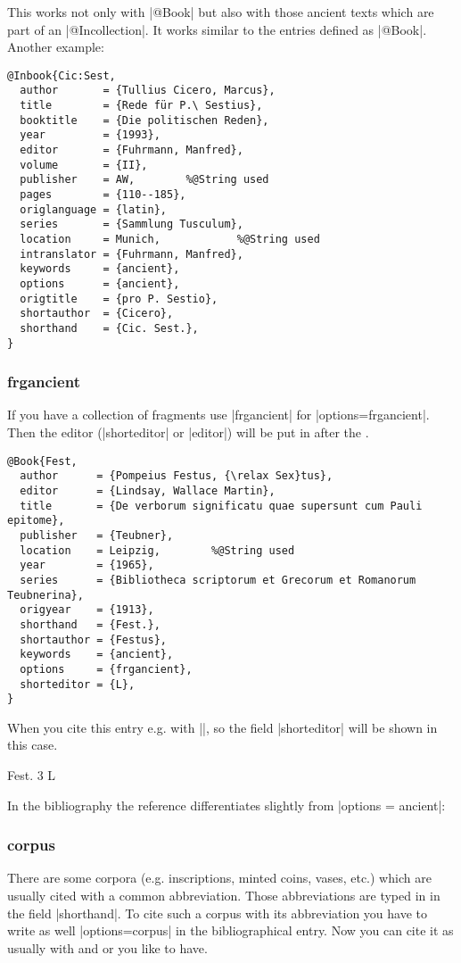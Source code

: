 \documentclass[a4paper,
10pt,
greek,
french,
spanish,
italian,
ngerman,
english
]{ltxdoc}
\begin{document}
This works not only with |@Book| but also with those ancient texts which are part of an |@Incollection|.
It works similar to the entries defined as |@Book|.
Another example:
\begin{lstlisting}[style=bibentry,label=Cic:Sest,caption={{@}Inbook\{Cic:Sest,…\} }]
@Inbook{Cic:Sest,
  author       = {Tullius Cicero, Marcus},
  title        = {Rede für P.\ Sestius},
  booktitle    = {Die politischen Reden},
  year         = {1993},
  editor       = {Fuhrmann, Manfred},
  volume       = {II},
  publisher    = AW,		%@String used
  pages        = {110--185},
  origlanguage = {latin},
  series       = {Sammlung Tusculum},
  location     = Munich,			%@String used
  intranslator = {Fuhrmann, Manfred},
  keywords     = {ancient},
  options      = {ancient},
  origtitle    = {pro P. Sestio},
  shortauthor  = {Cicero},
  shorthand    = {Cic. Sest.},
}
\end{lstlisting}




\subsubsection{frgancient}\label{frgancient}
 If you have a collection of fragments use |frgancient| for |options={frgancient}|.
 Then the editor (|shorteditor| or |editor|) will be put in after the .
\begin{lstlisting}[style=bibentry,label=Fest,caption={{@}Book\{Fest,…\} }]
@Book{Fest,
  author      = {Pompeius Festus, {\relax Sex}tus},
  editor      = {Lindsay, Wallace Martin},
  title       = {De verborum significatu quae supersunt cum Pauli epitome},
  publisher   = {Teubner},
  location    = Leipzig, 		%@String used
  year        = {1965},
  series      = {Bibliotheca scriptorum et Grecorum et Romanorum Teubnerina},
  origyear    = {1913},
  shorthand   = {Fest.},
  shortauthor = {Festus},
  keywords    = {ancient},
  options     = {frgancient},
  shorteditor = {L},
}
\end{lstlisting}
When you cite this entry  e.g. with |\cite[3]{Fest}|, so the field  |shorteditor| will be shown in this case.
 \begin{bsp}
 Fest. 3 L
 \end{bsp}
In the bibliography the reference  differentiates slightly from  |options = {ancient}|:



\subsubsection{corpus}\label{corpus}
There are some corpora (e.g. inscriptions, minted coins, vases, etc.) which are usually cited with a common abbreviation. 
Those abbreviations are typed in in the field |shorthand|.
To cite such a corpus with its abbreviation you have to write as well |options={corpus}| in the bibliographical entry.
Now you can cite it as usually with and  or  you like to have.
\end{document}
